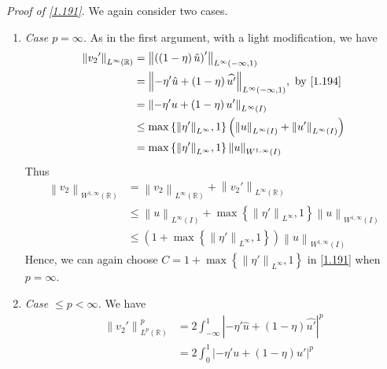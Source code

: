 \documentclass[a4paper,oneside]{book}
\numberwithin{equation}{chapter}
\begin{document}
\textit{Proof of \eqref{1.191}.} We again consider two cases.
\begin{enumerate}
\item \textit{Case $p=\infty$.} As in the first argument, with a light modification, we have
\begin{align}
{\left\| {{v_2}'} \right\|_{{L^\infty }\left( \mathbb{R} \right)}} &= {\left\| {\left( {\left( {1 - \eta } \right)\hat u} \right)'} \right\|_{{L^\infty }\left( { - \infty ,1} \right)}}\\
& = {\left\| { - \eta '\hat u + \left( {1 - \eta } \right)\widehat {u'}} \right\|_{{L^\infty }\left( { - \infty ,1} \right)}},\mbox{ by \eqref{1.194}}\\
& = {\left\| { - \eta 'u + \left( {1 - \eta } \right)u'} \right\|_{{L^\infty }\left( I \right)}}\\
& \le \max \left\{ {{{\left\| {\eta '} \right\|}_{{L^\infty }}},1} \right\}\left( {{{\left\| u \right\|}_{{L^\infty }\left( I \right)}} + {{\left\| {u'} \right\|}_{{L^\infty }\left( I \right)}}} \right)\\
& = \max \left\{ {{{\left\| {\eta '} \right\|}_{{L^\infty }}},1} \right\}{\left\| u \right\|_{{W^{1,\infty }}\left( I \right)}}
\end{align}
Thus
\begin{align}
{\left\| {{v_2}} \right\|_{{W^{1,\infty }}\left( \mathbb{R} \right)}} &= {\left\| {{v_2}} \right\|_{{L^\infty }\left( \mathbb{R} \right)}} + {\left\| {{v_2}'} \right\|_{{L^\infty }\left( \mathbb{R} \right)}}\\
& \le {\left\| u \right\|_{{L^\infty }\left( I \right)}} + \max \left\{ {{{\left\| {\eta '} \right\|}_{{L^\infty }}},1} \right\}{\left\| u \right\|_{{W^{1,\infty }}\left( I \right)}}\\
& \le \left( {1 + \max \left\{ {{{\left\| {\eta '} \right\|}_{{L^\infty }}},1} \right\}} \right){\left\| u \right\|_{{W^{1,\infty }}\left( I \right)}}
\end{align}
Hence, we can again choose $C = 1 + \max \left\{ {{{\left\| {\eta '} \right\|}_{{L^\infty }}},1} \right\}$ in \eqref{1.191} when $p=\infty$.
\item \textit{Case $\le p<\infty$.} We have
\begin{align}
\left\| {{v_2}'} \right\|_{{L^p}\left( \mathbb{R}  \right)}^p &= 2\int_{ - \infty }^1 {{{\left| { - \eta '\hat u + \left( {1 - \eta } \right)\widehat {u'}} \right|}^p}} \\
 &= 2\int_0^1 {{{\left| { - \eta 'u + \left( {1 - \eta } \right)u'} \right|}^p}} \\

\end{align}
\end{enumerate}
\end{document}
